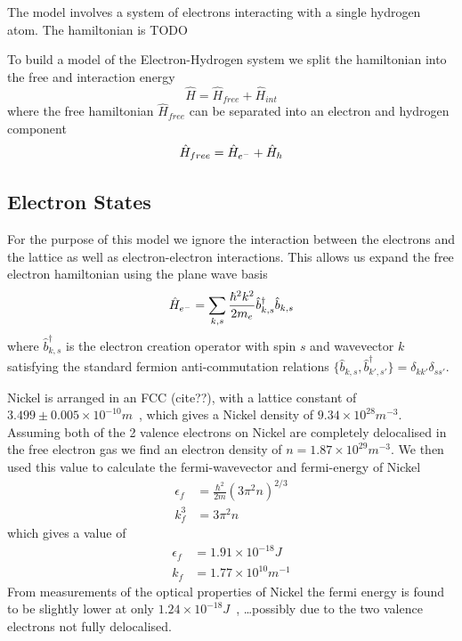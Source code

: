 
The model involves a system of electrons
interacting with
a single hydrogen atom.
The hamiltonian is TODO


To build a model of the Electron-Hydrogen
system we split the hamiltonian into
the free and interaction energy
\begin{equation}
  \hat{H} = \hat{H}_{free} + \hat{H}_{int}
\end{equation}
where the free hamiltonian \(\hat{H}_{free}\)
can be separated
into an electron and hydrogen component
\begin{equation}
  \hat{H}_{free} =
  \hat{H}_{e^-} + \hat{H}_{h}\\
\end{equation}



\subsection{Electron States}\label{sec:electron states}
For the purpose of this model we ignore the
interaction between the electrons
and the lattice as well as electron-electron
interactions. This allows
us expand the free electron
hamiltonian using the plane wave
basis
\begin{equation}
  \hat{H}_{e^-} = \sum_{k, s}
  \frac{\hbar^2 k^2}{2m_e} \hat{b}^\dagger_{k, s} \hat{b}_{k, s}\\
\end{equation}
where \(\hat{b}^\dagger_{k, s}\)
is the electron creation operator
with spin \(s\) and wavevector
\(k\) satisfying the standard
fermion anti-commutation relations
\( \{ \hat{b}_{k, s}, \hat{b}^\dagger_{k', s'} \}
= \delta_{k k'} \delta_{s s'}\).

Nickel is arranged in an FCC (cite??),
with a lattice constant of
\(3.499\pm{}0.005\times{}10^{-10}m\)~\cite{PhysRev.25.753},
which gives a Nickel density of
\(9.34\times{}10^{28}m^{-3}\).
Assuming both of the 2 valence
electrons on Nickel are completely
delocalised in
the free electron gas we
find an electron density of
\(n = 1.87\times{}10^{29} m^{-3}\).
We then used this value to calculate
the fermi-wavevector and fermi-energy of
Nickel~\cite{KittelCharles1953Itss}
\begin{align}
  \epsilon_f & = \frac{\hbar^2}{2m} {(3\pi^2n)}^{2/3} \\
  k_f^3      & = 3 \pi^2 n
\end{align}
which gives a value of
\begin{align}
  \epsilon_f & = 1.91\times{}10^{-18}J                                  \\
  k_f        & = 1.77\times{}10^{10}m^{-1} \label{eqn:fermi wavevector}
\end{align}
From measurements of the optical
properties of Nickel the
fermi energy is found to
be slightly lower
at only
\(1.24\times{} 10^{-18}J\)~\cite{PhysRev.131.2469},
\ldots possibly due to the two
valence electrons not fully delocalised.

